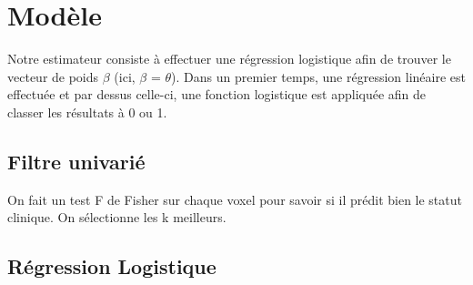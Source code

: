 \section{Modèle}

Notre estimateur consiste à effectuer une régression logistique afin de trouver le vecteur de poids $\beta$ (ici, $\beta$ = $\theta$).
Dans un premier temps, une régression linéaire est effectuée et par dessus celle-ci, une fonction logistique est appliquée afin de classer les résultats à 0 ou 1. 

\subsection{Filtre univarié}

On fait un test F de Fisher sur chaque voxel pour savoir si il prédit bien le statut clinique.
On sélectionne les k meilleurs.

\subsection{Régression Logistique}

% 
%  
% 
% 
% 

